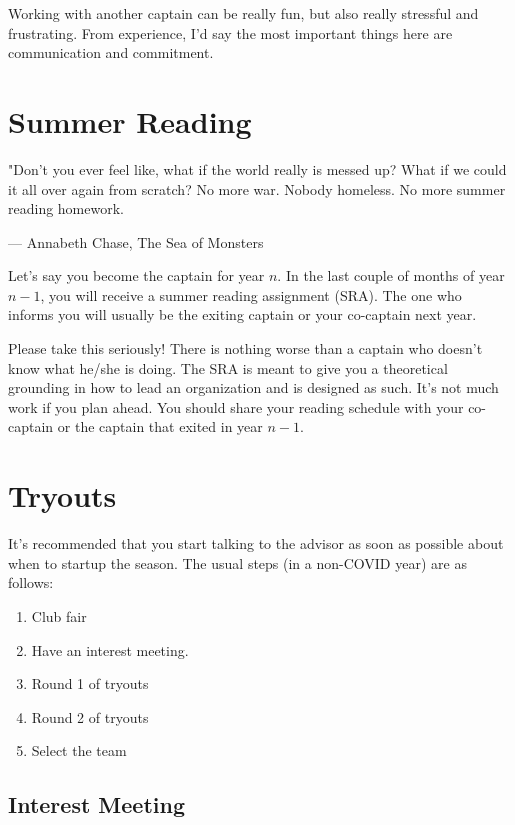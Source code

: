 \documentclass[11pt, letterpaper]{article}
\begin{document}
Working with another captain can be really fun, but also really stressful and frustrating.
From experience, I'd say the most important things here are communication and commitment.



\newpage

\section{Summer Reading}
\epigraph{"Don't you ever feel like, what if the world really is messed up? What if we could it all over again from scratch? No more war. Nobody homeless. No more summer reading homework.}{--- \textup{Annabeth Chase}, The Sea of Monsters}

Let's say you become the captain for year $n$.
In the last couple of months of year $n-1$, you will receive a summer reading assignment (SRA).
The one who informs you will usually be the exiting captain or your co-captain next year.

Please take this seriously! 
There is nothing worse than a captain who doesn't know what he/she is doing.
The SRA is meant to give you a theoretical grounding in how to lead an organization and is designed as such.
It's not much work if you plan ahead.
You should share your reading schedule with your co-captain or the captain that exited in year $n-1$.

\newpage

\section{Tryouts}

It's recommended that you start talking to the advisor as soon as possible about when to startup the season.
The usual steps (in a non-COVID year) are as follows:

\begin{enumerate}
    \item Club fair
    \item Have an interest meeting.
    \item Round 1 of tryouts
    \item Round 2 of tryouts
    \item Select the team
\end{enumerate}

\subsection{Interest Meeting}
\end{document}
